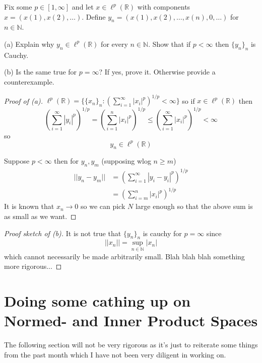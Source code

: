 \begin{prob}
    Fix some $p \in [1,\infty]$ and let $x \in \ell^p(\mathbb R)$
    with components $x = (x(1),x(2), \ldots)$. 
    Define $y_n = (x(1), x(2), \ldots, x(n), 0,\ldots)$ for 
    $n \in \mathbb N$. 

    (a) Explain why $y_n \in \ell^p(\mathbb R)$ for every 
    $n \in \mathbb N$. Show that if $p < \infty$ then 
    $\{y_n\}_n$ is Cauchy.

    (b) Is the same true for $p = \infty$? If yes, prove it. 
    Otherwise provide a counterexample.
\end{prob}
\begin{proof}[Proof of (a)]
    $\ell^p(\mathbb R) = \{\{x_n\}_n : (\sum_{i=1}^\infty |x_i|^p
        )^{1/p} < 
    \infty\}$ so if $x \in \ell^p(\mathbb R)$ then 
    \[
        \left(\displaystyle\sum_{i=1}^\infty |y_i|^p\right)^{1/p}
        = 
        \left(\displaystyle\sum_{i=1}^n |x_i|^p\right)^{1/p}
        \leq 
        \left(\displaystyle\sum_{i=1}^\infty |x_i|^p\right)^{1/p} 
        < \infty
    \]
    so 
    \[
        y_n \in \ell^p(\mathbb R)
    \]

    Suppose $p < \infty$ then for $y_n,y_m$ (supposing wlog 
    $n \geq m$)
    \begin{align*}
        ||y_n - y_m|| &= 
        \left(\displaystyle\sum_{i=1}^\infty 
        |y_i - y_i|^p\right)^{1/p} \\
        &= 
        \left(\displaystyle\sum_{i=m}^n 
        |x_i|^p\right)^{1/p}
    \end{align*}
    It is known that $x_n \to 0$ so we can pick $N$ large enough 
    so that the above sum is as small as we want. 
\end{proof}
\begin{proof}[Proof sketch of (b)]
    It is not true that $\{y_n\}_n$ is cauchy for $p = \infty$ since 
    \[
        ||x_n|| = \sup_{n\in\mathbb N}|x_n|
    \]
    which cannot necessarily be made arbitrarily small. 
    Blah blah blah something more rigorous...
\end{proof}

\newpage 
\section{Doing some cathing up on Normed- and Inner Product Spaces}
The following section will not be very rigorous as it's just to 
reiterate some things from the past month which I have not been 
very diligent in working on. 

